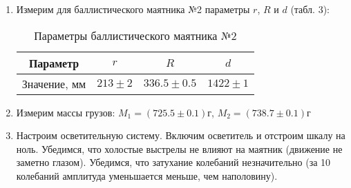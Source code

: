 \documentclass[a4paper, 10pt]{article}%
\begin{document}
\begin{enumerate}
		\item Измерим для баллистического маятника №2 параметры $r$, $R$ и $d$ (табл. 3):
		\begin{table}[h]
			\centering
			\caption{Параметры баллистического маятника №2}
			\begin{tabular}{|c|c|c|c|}
				\hline
				Параметр & $r$ & $R$ & $d$ \\
				\hline
				Значение, мм & $213 \pm 2$ & $336.5 \pm 0.5$ & $1422 \pm 1$ \\
				\hline
			\end{tabular}
		\end{table}
		
		\item Измерим массы грузов: $M_1 = \left(725.5 \pm 0.1\right) \text{г}$, $M_2 = \left(738.7 \pm 0.1\right) \text{г}$
		\item Настроим осветительную систему. Включим осветитель и отстроим шкалу на ноль. Убедимся, что холостые выстрелы не влияют на маятник (движение не заметно глазом). Убедимся, что затухание колебаний незначительно (за 10 колебаний амплитуда уменьшается меньше, чем наполовину).
		

\end{enumerate}
\end{document}
